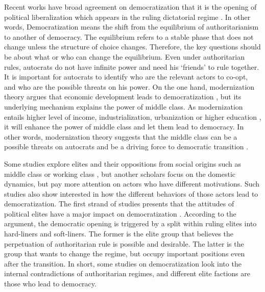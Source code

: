 \documentclass[11pt]{article}
\begin{document}
Recent works have broad agreement on democratization that it is the opening of political liberalization which appears in the ruling dictatorial regime \citep[7]{Carothers2002a}. In other words, Democratization means the shift from the equilibrium of authoritarianism to another of democracy. The equilibrium refers to a stable phase that does not change unless the structure of choice changes. Therefore, the key questions should be about what or who can change the equilibrium. Even under authoritarian rules, autocrats do not have infinite power and need his `friends' to rule together. It is important for autocrats to identify who are the relevant actors to co-opt, and who are the possible threats on his power. On the one hand, modernization theory argues that
economic development leads to democratization \citep{Huntington1993}, but its underlying mechanism explains the power of middle class. As modernization entails higher level of income, industrialization, urbanization or higher education \citep{Lipset1959a}, it will enhance the power of middle class and let them lead to democracy. In other words, modernization theory suggests that the middle class can be a possible threats on autocrats and be a driving force to democratic transition \citep{Moore1966}.

Some studies explore elites and their oppositions from social origins such as middle class or working class \citep{Moore1966, Rueschemeyer1992}, but another scholars focus on the domestic dynamics, but pay more attention on actors who have different motivations. Such studies also show interested in how the different behaviors of those actors lead to democratization. The first strand of studies presents that the attitudes of political elites have a major impact on democratization \citep{ODonnell1986}. According to the argument, the democratic opening is triggered by a split within ruling elites into hard-liners and soft-liners. The former is the elite group that believes the perpetuation of authoritarian rule is possible and 
desirable. The latter is the group that wants to change the regime, but occupy important positions even after the transition. In short, some studies on democratization look into the internal contradictions of authoritarian regimes, and different elite factions are those who lead to democracy.
\end{document}
